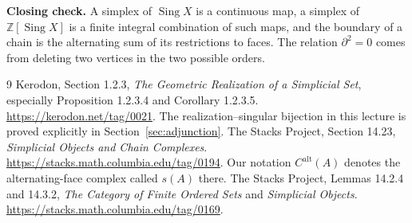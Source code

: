 \documentclass[11pt]{article}
\theoremstyle{linked}
\theoremstyle{plainlecture}
\newcommand{\Z}{\mathbb Z}
\newcommand{\Sing}{\operatorname{Sing}}
\newcommand{\C}{C^{\mathrm{alt}}}
\begin{document}
\medskip
\noindent\textbf{Closing check.}
A simplex of $\Sing X$ is a continuous map, a simplex of $\Z[\Sing X]$ is a finite integral combination of such maps, and the boundary of a chain is the alternating sum of its restrictions to faces. The relation $\partial^2=0$ comes from deleting two vertices in the two possible orders.

\begin{thebibliography}{9}
Kerodon, Section 1.2.3, \emph{The Geometric Realization of a Simplicial Set}, especially Proposition 1.2.3.4 and Corollary 1.2.3.5.
\url{https://kerodon.net/tag/0021}.
The realization--singular bijection in this lecture is proved explicitly in Section~\ref{sec:adjunction}.
The Stacks Project, Section 14.23, \emph{Simplicial Objects and Chain Complexes}.
\url{https://stacks.math.columbia.edu/tag/0194}.
Our notation $\C(A)$ denotes the alternating-face complex called $s(A)$ there.
The Stacks Project, Lemmas 14.2.4 and 14.3.2, \emph{The Category of Finite Ordered Sets} and \emph{Simplicial Objects}.
\url{https://stacks.math.columbia.edu/tag/0169}.
\end{thebibliography}
\end{document}
